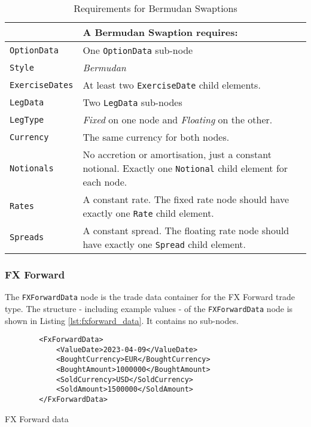 \begin{table}[H]
\centering
\begin{tabu} to 0.9\linewidth {| X[-1.5,l,m] | X[-5,l,m] |}
    \hline
        & \bfseries{A Bermudan Swaption requires:} \\  \hline
    \lstinline!OptionData! & One \lstinline!OptionData! sub-node  \\  \hline
   \lstinline!Style! &  \emph{Bermudan}\\ \hline
    \lstinline!ExerciseDates! & At least two \lstinline!ExerciseDate! child elements.\\ \hline
    \lstinline!LegData! &  Two \lstinline!LegData! sub-nodes \\ \hline
    \lstinline!LegType! & \emph{Fixed} on one node and \emph{Floating} on the other.\\ \hline    
    \lstinline!Currency! & The same currency for both nodes.\\ \hline 
    \lstinline!Notionals! & No accretion or amortisation, just a constant notional. Exactly one \lstinline!Notional! child element for each node.\\ \hline
    \lstinline!Rates! & A constant rate. The fixed rate node should have exactly one \lstinline!Rate! child element.\\ \hline
    \lstinline!Spreads! &  A constant spread. The floating rate node should have exactly one \lstinline!Spread! child element.\\ \hline
  \end{tabu}
  \caption{Requirements for Bermudan Swaptions}
  \label{tab:bermudan_requirements}
\end{table}

\subsubsection{FX Forward}

The \lstinline!FXForwardData!  node is the trade data container for the FX Forward trade type.  The structure - including example values - of the \lstinline!FXForwardData!   node is shown in Listing \ref{lst:fxforward_data}. It contains no sub-nodes.

\begin{listing}[H]
\begin{verbatim}
        <FxForwardData>
            <ValueDate>2023-04-09</ValueDate>
            <BoughtCurrency>EUR</BoughtCurrency>
            <BoughtAmount>1000000</BoughtAmount>
            <SoldCurrency>USD</SoldCurrency>
            <SoldAmount>1500000</SoldAmount>
        </FxForwardData>
\end{verbatim}
\caption{FX Forward data}
\label{lst:fxforward_data}
\end{listing}

